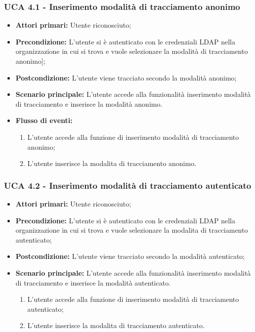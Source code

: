 \subsubsection{UCA 4.1 - Inserimento modalità di tracciamento anonimo}%
\begin{itemize}
\item \textbf{Attori primari:} Utente riconosciuto;
\item \textbf{Precondizione:} L'utente si è autenticato con le credenziali LDAP nella organizzazione in cui si trova e vuole selezionare la modalità di tracciamento anonimo];
\item \textbf{Postcondizione:} L'utente viene tracciato secondo la modalità anonimo;
\item \textbf{Scenario principale:} L'utente accede alla funzionalità inserimento modalità di tracciamento e inserisce la modalità anonimo.
\item \textbf{Flusso di eventi:}
\begin{enumerate}
	\item L'utente accede alla funzione di inserimento modalità di tracciamento anonimo;
	\item L'utente inserisce la modalita di tracciamento anonimo.
\end{enumerate}

\end{itemize}

\subsubsection{UCA 4.2 - Inserimento modalità di tracciamento autenticato}%
\begin{itemize}
	\item \textbf{Attori primari:} Utente riconosciuto;
	\item \textbf{Precondizione:} L'utente si è autenticato con le credenziali LDAP nella organizzazione in cui si trova e vuole selezionare la modalita di tracciamento autenticato;
	\item \textbf{Postcondizione:} L'utente viene tracciato secondo la modalità autenticato;
	\item \textbf{Scenario principale:} L'utente accede alla funzionalità inserimento modalità di tracciamento e inserisce la modalità autenticato.
	\begin{enumerate}
		\item L'utente accede alla funzione di inserimento modalità di tracciamento autenticato;
		\item L'utente inserisce la modalita di tracciamento autenticato.
	\end{enumerate}
\end{itemize}
